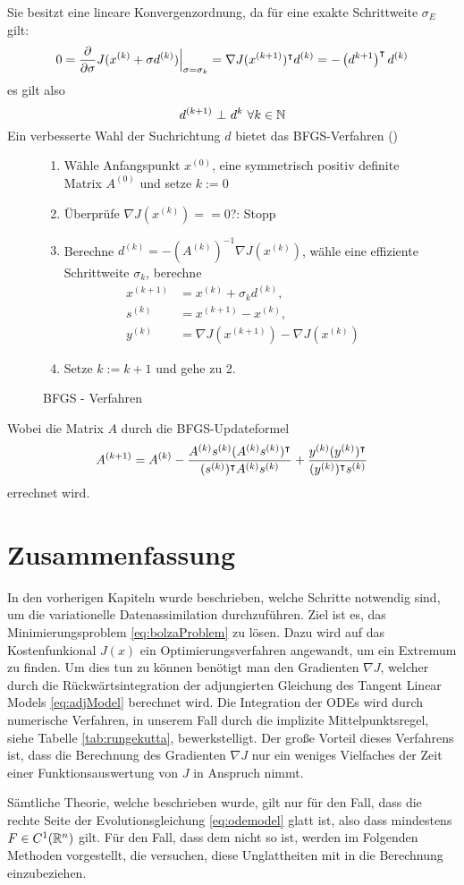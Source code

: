 Sie besitzt eine lineare Konvergenzordnung, da für eine exakte Schrittweite $\sigma_E$ gilt:
\[
 0 = \frac{\partial }{\partial \sigma} J(x^{(k)} + \sigma d^{(k)}) \Big|_{\sigma = \sigma_k} = \nabla J(x^{(k+1)})^\intercal d^{(k)} = - \left( d^{k+1}\right)^\intercal d^{(k)}
\]
es gilt also
\[
 d^{(k+1)}~\bot ~d^{k} ~ \forall k \in \mathbb{N}
\]
Ein verbesserte Wahl der Suchrichtung $d$ bietet das BFGS-Verfahren (\cite[Verfahren 4.8.11]{alt2002nichtlineare})
\begin{figure}[H]
\begin{framed}
\begin{enumerate}
 \item Wähle Anfangspunkt $x^{(0)}$, eine symmetrisch positiv definite Matrix $A^{(0)}$ und setze $k:=0$
 \item Überprüfe $\nabla J(x^{(k)}) == 0$?: Stopp
 \item Berechne $d^{(k)} = -\left( A^{(k)} \right)^{-1} \nabla J(x^{(k)})$, wähle eine effiziente Schrittweite $\sigma_k$, berechne 
 \[
 \begin{aligned}
  x^{(k+1)} &= x^{(k)} + \sigma_k d^{(k)}, \\ s^{(k)} &= x^{(k+1)} - x^{(k)},\\ y^{(k)} &= \nabla J(x^{(k+1)})- \nabla J(x^{(k)})
 \end{aligned}
 \]
 \item Setze $k:= k+1$ und gehe zu 2.
\end{enumerate} 
\end{framed}
 \caption{BFGS - Verfahren}
\end{figure}
Wobei die Matrix $A$ durch die BFGS-Updateformel 
\[
 A^{(k+1)} = A^{(k)} - \frac{A^{(k)}s^{(k)}(A^{(k)}s^{(k)})^\intercal}{(s^{(k)})^\intercal A^{(k)}s^{(k)}} + \frac{y^{(k)} (y^{(k)})^\intercal}{(y^{(k)})^\intercal s^{(k)}}
\]
errechnet wird.


\section{Zusammenfassung}
In den vorherigen Kapiteln wurde beschrieben, welche Schritte notwendig sind, um die variationelle Datenassimilation durchzuführen.
Ziel ist es, das Minimierungsproblem \eqref{eq:bolzaProblem} zu lösen. Dazu wird auf das Kostenfunkional $J(x)$ ein Optimierungsverfahren angewandt, um ein Extremum zu finden. Um dies tun zu können benötigt man den Gradienten $\nabla J$, welcher durch die Rückwärtsintegration der  adjungierten Gleichung des Tangent Linear Models \eqref{eq:adjModel} berechnet wird. Die Integration der ODEs wird durch numerische Verfahren, in unserem Fall durch die implizite Mittelpunktsregel, siehe Tabelle \ref{tab:rungekutta}, bewerkstelligt. Der große Vorteil dieses Verfahrens ist, dass die Berechnung des Gradienten $\nabla J$ nur ein weniges Vielfaches der Zeit einer Funktionsauswertung von $J$ in Anspruch nimmt. 

Sämtliche Theorie, welche beschrieben wurde, gilt nur für den Fall, dass die rechte Seite der Evolutionsgleichung \eqref{eq:odemodel} glatt ist, also dass mindestens $F\in C^1(\mathbb{R}^n)$ gilt. Für den Fall, dass dem nicht so ist, werden im Folgenden Methoden vorgestellt, die versuchen, diese Unglattheiten mit in die Berechnung einzubeziehen.
